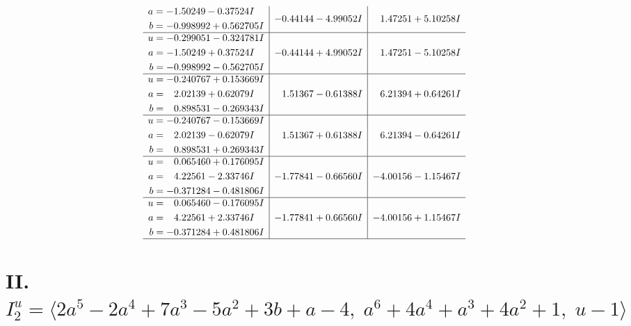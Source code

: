 \documentclass[1p]{elsarticle_modified}
\theoremstyle{definition}
\begin{document}
$$\begin{array}{c|c|c}
\begin{aligned}
a &= -1.50249 - 0.37524 I \\
b &= -0.998992 + 0.562705 I\end{aligned}
 & -0.44144 - 4.99052 I & \phantom{-}1.47251 + 5.10258 I \\ \hline\begin{aligned}
u &= -0.299051 - 0.324781 I \\
a &= -1.50249 + 0.37524 I \\
b &= -0.998992 - 0.562705 I\end{aligned}
 & -0.44144 + 4.99052 I & \phantom{-}1.47251 - 5.10258 I \\ \hline\begin{aligned}
u &= -0.240767 + 0.153669 I \\
a &= \phantom{-}2.02139 + 0.62079 I \\
b &= \phantom{-}0.898531 - 0.269343 I\end{aligned}
 & \phantom{-}1.51367 - 0.61388 I & \phantom{-}6.21394 + 0.64261 I \\ \hline\begin{aligned}
u &= -0.240767 - 0.153669 I \\
a &= \phantom{-}2.02139 - 0.62079 I \\
b &= \phantom{-}0.898531 + 0.269343 I\end{aligned}
 & \phantom{-}1.51367 + 0.61388 I & \phantom{-}6.21394 - 0.64261 I \\ \hline\begin{aligned}
u &= \phantom{-}0.065460 + 0.176095 I \\
a &= \phantom{-}4.22561 - 2.33746 I \\
b &= -0.371284 - 0.481806 I\end{aligned}
 & -1.77841 - 0.66560 I & -4.00156 - 1.15467 I \\ \hline\begin{aligned}
u &= \phantom{-}0.065460 - 0.176095 I \\
a &= \phantom{-}4.22561 + 2.33746 I \\
b &= -0.371284 + 0.481806 I\end{aligned}
 & -1.77841 + 0.66560 I & -4.00156 + 1.15467 I\\
 \hline 
 \end{array}$$\newpage\newpage\renewcommand{\arraystretch}{1}
\centering \section*{II. $I^u_{2}= \langle 2 a^5-2 a^4+7 a^3-5 a^2+3 b+a-4,\;a^6+4 a^4+a^3+4 a^2+1,\;u-1 \rangle$}
\end{document}
